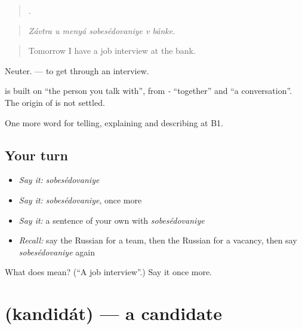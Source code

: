 \begin{quote}
     .
\end{quote}

\begin{quote}
\emph{Závtra u menyá sobesédovaniye v bánke.}
\end{quote}

\begin{quote}
Tomorrow I have a job interview at the bank.
\end{quote}

Neuter. \emph{ } — to get through an interview.

\begin{cousinweb}
\textbf{} is built on \emph{} \textquotedblleft{}the person you talk with\textquotedblright{}, from \emph{-} \textquotedblleft{}together\textquotedblright{} and \emph{} \textquotedblleft{}a conversation\textquotedblright{}. The origin of \emph{} is not settled.
\end{cousinweb}

\begin{grammarlens}[title={What you've built}]
One more word for telling, explaining and describing at B1.
\end{grammarlens}

\subsection*{Your turn}
\begin{itemize}
\raggedright
  \item \emph{Say it:} \emph{sobesédovaniye}
  \item \emph{Say it:} \emph{sobesédovaniye}, once more
  \item \emph{Say it:} a sentence of your own with \emph{sobesédovaniye}
  \item \emph{Recall:} say the Russian for a team, then the Russian for a vacancy, then say \emph{sobesédovaniye} again
\end{itemize}

\begin{tcolorbox}[breakable,colback=teal!4,colframe=teal!35!black,title={Before you move on}]
What does  mean? (\textquotedblleft{}A job interview\textquotedblright{}.) Say it once more.
\end{tcolorbox}
\section[\texorpdfstring{\ru{кандидат} (kandidát)}{кандидат (kandidát)}]{ (kandidát) — a candidate}

